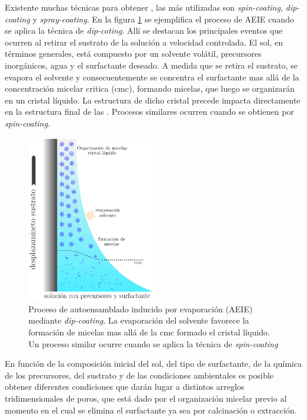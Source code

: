 	Existente muchas técnicas para obtener \pdm\space, las más utilizadas son \textit{spin-coating}, \textit{dip-coating} y \textit{spray-coating}. En la figura \ref{fig:autoensam} se ejemplifica el proceso de AEIE cuando se aplica la técnica de \textit{dip-coting}. Allí se destacan los principales eventos que ocurren al retirar el sustrato de la solución a velocidad controlada. El sol, en términos generales, está compuesto por un solvente volátil, precursores inorgánicos, agua y el surfactante deseado. A medida que se retira el sustrato, se evapora el solvente y consecuentemente se concentra el surfactante mas allá de la concentración micelar critica (cmc), formando micelas, que luego se organizarán en un cristal líquido. La estructura de dicho cristal precede impacta directamente en la estructura final de las \pdm. Procesos similares ocurren cuando se obtienen \pdm\space por \textit{spin-coating}. 
 			
 			\begin{figure}[th!]
 				\begin{center}
 				\includegraphics[width=0.5\textwidth]{Esquemas/autoensam.pdf}
 				\caption[Proceso de autoensamblado inducido por evaporación (AEIE)]{Proceso de autoensamblado inducido por evaporación (AEIE) mediante \textit{dip-coating}. La evaporación del solvente favorece la formación de micelas mas allá de la cmc formado el cristal líquido. Un proceso similar ocurre cuando se aplica la técnica de \textit{spin-coating}}
 		   		\label{fig:autoensam}
 		    	\end{center}
 		    	\end{figure}
	
   	En función de la composición inicial del sol, del tipo de surfactante, de la química de los precursores, del sustrato y de las condiciones ambientales es posible obtener diferentes condiciones que darán lugar a distintos arreglos tridimensionales de poros, que está dado por el organización micelar previo al momento en el cual se elimina el surfactante ya sea por calcinación o extracción.\cite{Grosso2004,Grosso2002,Crepaldi2002a,Grosso2003,Violi2015} 
	




